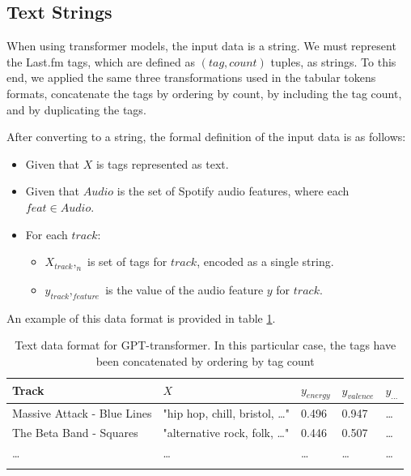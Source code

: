 \documentclass[sn-mathphys]{sn-jnl}%
\theoremstyle{thmstyleone}%
\theoremstyle{thmstyletwo}%
\theoremstyle{thmstylethree}%
\begin{document}
\subsection{Text Strings}

When using transformer models, the input data is a string.
We must represent the Last.fm tags, which are defined as $(tag, count)$ tuples, as strings.
To this end, we applied the same three transformations used in the tabular tokens formats,
concatenate the tags by ordering by count, by including the tag count, and by duplicating the tags.

After converting to a string, the formal definition of the input data is as follows:

\begin{itemize}
      \item Given that $X$ is tags represented as text.
      \item Given that $Audio$ is the set of Spotify audio features, where each $feat \in Audio$.
      \item For each $track$:
      \begin{itemize}
            \item $X_{track},_{n}$ is set of tags for $track$, encoded as a single string.
            \item $y_{track},_{feature}$ is the value of the audio feature $y$ for $track$.
      \end{itemize}
\end{itemize}

An example of this data format is provided in table \ref{text_format}.

\begin{table}[h]
      \begin{center}
      \begin{minipage}{\textwidth}
      \caption{Text data format for GPT-transformer. In this particular case, the tags have been concatenated by ordering by tag count}\label{text_format}%
      \begin{tabular}{@{}lllll@{}}
      \toprule
      Track                         & $X$                                   & $y_{energy}$ & $y_{valence}$ & $y_{\dots}$ \\
      \midrule
      Massive Attack - Blue Lines   & "hip hop, chill, bristol, \dots"      & 0.496        & 0.947         & \dots  \\
      The Beta Band - Squares       & "alternative rock, folk, \dots"       & 0.446        & 0.507         & \dots \\
      \dots                         & \dots                                 & \dots        & \dots         & \dots  \\
      \botrule
      \end{tabular}
      \end{minipage}
      \end{center}
\end{table}
\end{document}
